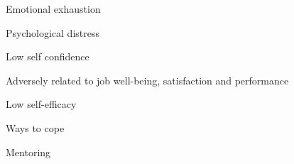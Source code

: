 \documentclass[aspectratio=169]{beamer}
\begin{document}
\begin{frame}
  \begin{center}
    \Huge Emotional exhaustion
    \\ \small \cite{hh15}
  \end{center}
\end{frame}


\begin{frame}
  \begin{center}
    \Huge Psychological distress
    \\ \small \cite{hh15}
  \end{center}
\end{frame}

\begin{frame}
  \begin{center}
    \Huge Low self confidence
    \\ \small \cite{hh15}
  \end{center}
\end{frame}

\begin{frame}
  \begin{center}
    \Huge Adversely related to job well-being, satisfaction and performance
    \\ \small \cite{hh15}
  \end{center}
\end{frame}

\begin{frame}
  \begin{center}
    \Huge Low self-efficacy
    \\ \small \cite{feedback}
  \end{center}
\end{frame}

\begin{frame}
  \begin{center}
    \Huge Ways to cope
  \end{center}
\end{frame}

\begin{frame}
  \begin{center}
    \Huge Mentoring
    \\ \small \cite{hh15}
  \end{center}
\end{frame}
\end{document}
